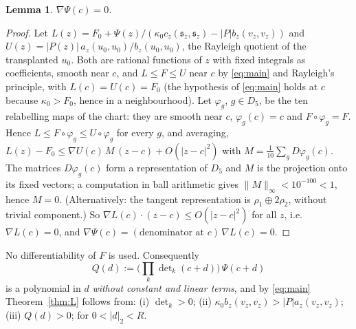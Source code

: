 \documentclass[11pt]{article}
\newtheorem{lemma}[theorem]{Lemma}
\theoremstyle{remark}
\newcommand{\s}{\mathfrak{s}}
\begin{document}
\begin{lemma}\label{lem:S}
$\nabla\Psi(c)=0$.
\end{lemma}
\begin{proof}
Let $L(z)=F_0+\Psi(z)/(\kappa_0c_z(\s_z,\s_z)-|P|b_z(v_z,v_z))$ and $U(z)=|P(z)|\,a_z(u_0,u_0)/b_z(u_0,u_0)$, the Rayleigh
quotient of the transplanted $u_0$. Both are rational functions of $z$ with fixed integrals as coefficients, smooth
near $c$, and $L\le F\le U$ near $c$ by \eqref{eq:main} and Rayleigh's principle, with $L(c)=U(c)=F_0$ (the hypothesis
of \eqref{eq:main} holds at $c$ because $\kappa_0>F_0$, hence in a neighbourhood). Let
$\varphi_g$, $g\in D_5$, be the ten relabelling maps of the chart: they are smooth near $c$, $\varphi_g(c)=c$ and
$F\circ\varphi_g=F$. Hence $L\le F\circ\varphi_g\le U\circ\varphi_g$ for every $g$, and averaging,
$L(z)-F_0\le\nabla U(c)\,M\,(z-c)+O(|z-c|^2)$ with $M=\frac1{10}\sum_gD\varphi_g(c)$. The matrices $D\varphi_g(c)$ form a
representation of $D_5$ and $M$ is the projection onto its fixed vectors; a computation in ball arithmetic gives
$\|M\|_\infty<10^{-100}<1$, hence $M=0$. (Alternatively: the tangent representation is $\rho_1\oplus2\rho_2$, without
trivial component.) So $\nabla L(c)\cdot(z-c)\le O(|z-c|^2)$ for all $z$, i.e.\ $\nabla L(c)=0$, and
$\nabla\Psi(c)=(\text{denominator at }c)\,\nabla L(c)=0$.
\end{proof}
No differentiability of $F$ is used. Consequently
\[
Q(d):=\Big(\prod_k\det\nolimits_k(c+d)\Big)\,\Psi(c+d)
\]
is a polynomial in $d$ \emph{without constant and linear terms}, and by \eqref{eq:main} Theorem~\ref{thm:L} follows
from: (i) $\det_k>0$; (ii) $\kappa_0b_z(v_z,v_z)>|P|a_z(v_z,v_z)$; (iii) $Q(d)>0$; for $0<|d|_2<R$.
\end{document}
